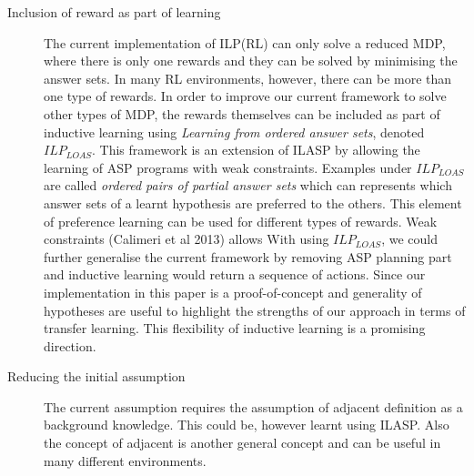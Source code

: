 \begin{description}
    \item[Inclusion of reward as part of learning]
    The current implementation of ILP(RL) can only solve a reduced MDP, where there is only one rewards and they can be solved by minimising the answer sets.
    In many RL environments, however, there can be more than one type of rewards. In order to improve our current framework to solve other types of MDP, 
    the rewards themselves can be included as part of inductive learning using \textit{Learning from ordered answer sets}, denoted $ILP_{LOAS}$. 
    This framework is an extension of ILASP by allowing the learning of ASP programs with weak constraints.
    Examples under $ILP_{LOAS}$ are called \textit{ordered pairs of partial answer sets} which can represents which answer sets of a learnt hypothesis are preferred to the others.
    This element of preference learning can be used for different types of rewards. 
    Weak constraints (Calimeri et al 2013) allows 
    With using $ILP_{LOAS}$, we could further generalise the current framework by removing ASP planning part and inductive learning would return a sequence of actions. 
    Since our implementation in this paper is a proof-of-concept and generality of hypotheses are useful to highlight the strengths of our approach in terms of transfer learning.
    This flexibility of inductive learning is a promising direction.
    \item[Reducing the initial assumption]
    The current assumption requires the assumption of adjacent definition as a background knowledge. This could be, however learnt using ILASP.
    Also the concept of adjacent is another general concept and can be useful in many different environments.
\end{description}
